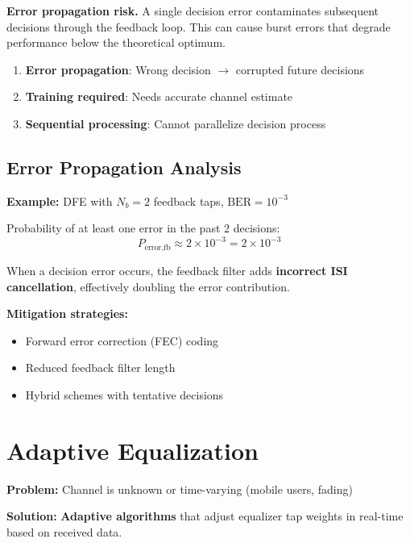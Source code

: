 \begin{warningbox}
\textbf{Error propagation risk.} A single decision error contaminates subsequent decisions through the feedback loop. This can cause burst errors that degrade performance below the theoretical optimum.
\end{warningbox}

\begin{enumerate}
\item \textbf{Error propagation}: Wrong decision $\rightarrow$ corrupted future decisions
\item \textbf{Training required}: Needs accurate channel estimate
\item \textbf{Sequential processing}: Cannot parallelize decision process
\end{enumerate}

\subsection{Error Propagation Analysis}

\textbf{Example:} DFE with $N_b = 2$ feedback taps, $\text{BER} = 10^{-3}$

Probability of at least one error in the past 2 decisions:
\begin{equation}
P_{\text{error,fb}} \approx 2 \times 10^{-3} = 2 \times 10^{-3}
\label{eq:dfe-error-prob}
\end{equation}

When a decision error occurs, the feedback filter adds \textbf{incorrect ISI cancellation}, effectively doubling the error contribution.

\textbf{Mitigation strategies:}
\begin{itemize}
\item Forward error correction (FEC) coding
\item Reduced feedback filter length
\item Hybrid schemes with tentative decisions
\end{itemize}

\section{Adaptive Equalization}
\label{sec:adaptive-equalization}

\textbf{Problem:} Channel is unknown or time-varying (mobile users, fading)

\textbf{Solution:} \textbf{Adaptive algorithms} that adjust equalizer tap weights in real-time based on received data.

